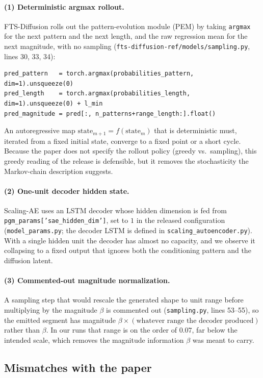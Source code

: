 \documentclass{article}
\begin{document}
\paragraph{(1) Deterministic argmax rollout.} FTS-Diffusion rolls out the pattern-evolution module (PEM) by taking \texttt{argmax} for the next pattern and the next length, and the raw regression mean for the next magnitude, with no sampling (\texttt{fts-diffusion-ref/models/sampling.py}, lines 30, 33, 34):
\begin{lstlisting}
pred_pattern   = torch.argmax(probabilities_pattern, dim=1).unsqueeze(0)
pred_length    = torch.argmax(probabilities_length,  dim=1).unsqueeze(0) + l_min
pred_magnitude = pred[:, n_patterns+range_length:].float()
\end{lstlisting}
An autoregressive map $\text{state}_{m+1}=f(\text{state}_m)$ that is deterministic must, iterated from a fixed initial state, converge to a fixed point or a short cycle. Because the paper does not specify the rollout policy (greedy vs.\ sampling), this greedy reading of the release is defensible, but it removes the stochasticity the Markov-chain description suggests.

\paragraph{(2) One-unit decoder hidden state.} Scaling-AE uses an LSTM decoder whose hidden dimension is fed from \texttt{pgm\_params['sae\_hidden\_dim']}, set to $1$ in the released configuration (\texttt{model\_params.py}; the decoder LSTM is defined in \texttt{scaling\_autoencoder.py}). With a single hidden unit the decoder has almost no capacity, and we observe it collapsing to a fixed output that ignores both the conditioning pattern and the diffusion latent.

\paragraph{(3) Commented-out magnitude normalization.} A sampling step that would rescale the generated shape to unit range before multiplying by the magnitude $\beta$ is commented out (\texttt{sampling.py}, lines 53--55), so the emitted segment has magnitude $\beta\times(\text{whatever range the decoder produced})$ rather than $\beta$. In our runs that range is on the order of $0.07$, far below the intended scale, which removes the magnitude information $\beta$ was meant to carry.

\subsection{Mismatches with the paper}
\label{sec:degeneracy:mismatch}
\end{document}
